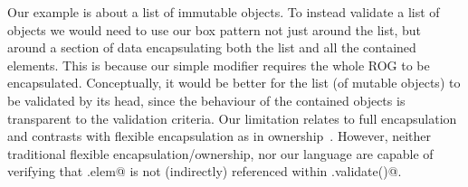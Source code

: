 Our example is about a list of immutable objects.
To instead validate a list of \Q@mut@ objects we would need to use our box pattern not just around the list,
but around a section of data encapsulating both the list and all the contained elements.
This is because our simple \Q@capsule@ modifier requires the whole ROG to be encapsulated.
Conceptually, it would be better for the list (of mutable objects) to be validated by its
head, since the behaviour of the contained objects is transparent to the validation criteria. 
Our limitation relates to full encapsulation and contrasts with flexible encapsulation as in 
ownership~\cite{ClarkeEtAl98}. However, neither traditional flexible encapsulation/ownership, nor our language are capable of verifying that \Q@List.elem@ is not (indirectly) referenced within \Q@ListBox.validate()@.

